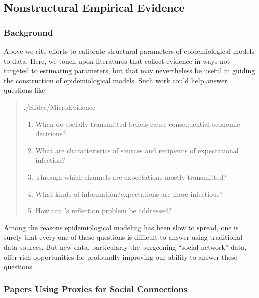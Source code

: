 \subsection{Nonstructural Empirical Evidence}\label{subsec:microEvidence}


\subsubsection{Background}

Above we cite efforts to calibrate structural parameters of epidemiological models to data.  %
Here, we touch upon literatures that collect evidence in ways not targeted to estimating parameters, but that may nevertheless be useful in guiding the construction of epidemiological models.  Such work could help answer questions like
\begin{quote}
    \normalfont
    \begin{verbatimwrite}{./Slides/MicroEvidence}
\begin{enumerate}
	\item When do socially transmitted beliefs cause consequential economic decisions?
    \item What are characteristics of sources and recipients of expectational infection?
    \item Through which channels are expectations mostly transmitted?
    \item What kinds of information/expectations are more infectious?
    \item How can \cite{manski1993identification}'s reflection problem be addressed?
    \end{enumerate}
\end{verbatimwrite}

\end{quote}

Among the reasons epidemiological modeling has been slow to spread, one is surely that every one of these questions is difficult to answer using traditional data sources.  But new data, particularly the burgeoning ``social network'' data, offer rich opportunities for profoundly improving our ability to answer these questions.

\subsubsection{Papers Using Proxies for Social Connections}

